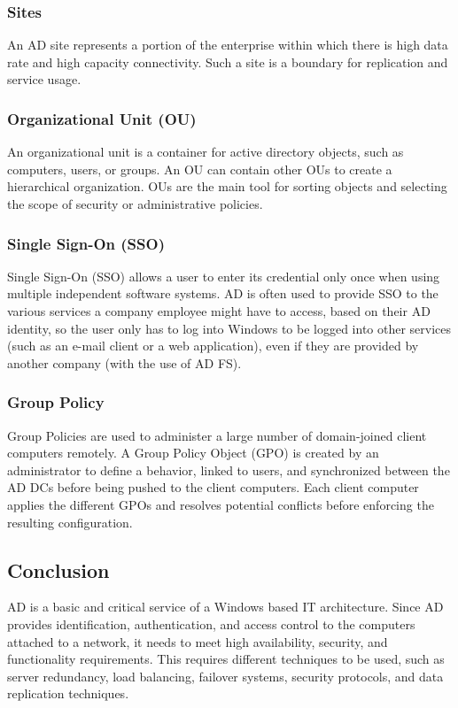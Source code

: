 \subsubsection{Sites}
An AD site represents a portion of the enterprise within which there is high data rate and high capacity connectivity. Such a site is a boundary for replication and service usage\cite[p. 11]{holme_self-paced_2011}.

\subsubsection{Organizational Unit (OU)}
An organizational unit is a container for active directory objects, such as computers, users, or groups. An OU can contain other OUs to create a hierarchical organization. OUs are the main tool for sorting objects and selecting the scope of security or administrative policies\cite[p. 11]{holme_self-paced_2011}.

\subsubsection{Single Sign-On (SSO)}
Single Sign-On (SSO) allows a user to enter its credential only once when using multiple independent software systems. AD is often used to provide SSO to the various services a company employee might have to access, based on their AD identity, so the user only has to log into Windows to be logged into other services (such as an e-mail client or a web application), even if they are provided by another company (with the use of AD FS).

\subsubsection{Group Policy}
Group Policies are used to administer a large number of domain-joined client computers remotely. A Group Policy Object (GPO) is created by an administrator to define a behavior, linked to users, and synchronized between the AD DCs before being pushed to the client computers. Each client computer applies the different GPOs and resolves potential conflicts before enforcing the resulting configuration.


\subsection{Conclusion}
AD is a basic and critical service of a Windows based IT architecture. Since AD provides identification, authentication, and access control to the computers attached to a network, it needs to meet high availability, security, and functionality requirements.
This requires different techniques to be used, such as server redundancy, load balancing, failover systems, security protocols, and data \linebreak[4]replication techniques.


